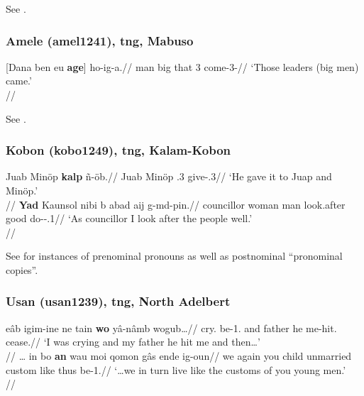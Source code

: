 See \citet[17f., 166, 181]{renck1975}.

\subsubsection{Amele (amel1241), \gls{tng}, Mabuso}

\ex \begingl
\gla {}[{Dana} {ben} {eu} \textbf{age}] ho-ig-a.//
\glb man big that 3\Pl{} come-3\Pl{}-\Todpst{}//
\glft `Those leaders (big men) came.'\\{\citep[after][210, (283)-(284)]{roberts1987amele}}//
\endgl
\xe

See \citet[162, 201, 209f.]{roberts1987amele}.

\subsubsection{Kobon (kobo1249), \gls{tng}, Kalam-Kobon}

\pex
\a
\begingl
\gla Juab Minöp \textbf{kal\textbari{}p} ñ-öb.//
\glb Juab Minöp \Obj.3\Du{}{} give-\Prf.3\Sg{}//
\glft `He gave it to Juap and Minöp.'\\{\citep[after][108, (264)]{davies1989}}//
\endgl
\a
\begingl
\gla \textbf{Yad} Kaunsol nibi b\textbari{} abad aij g\textbari{}-m\textbari{}d-pin.//
\Sg{} councillor woman man look.after good do-\Habit-\Pfv.1\Sg{}//
\glft `As councillor I look after the people well.' \\\citep[157, (408ad)]{davies1989}//
\endgl
\xe 

See  \citet[107f., 157]{davies1989} for instances of prenominal pronouns as well as postnominal ``pronominal copies''.

\subsubsection{Usan (usan1239), \gls{tng}, North Adelbert} 

\pex
\a \begingl
\gla eâb igim-ine ne tain \textbf{wo} yâ-nâmb wogub\ldots//
\glb cry.\Ss{} be-1\Sg.\Ds{} and father he me-hit.\Ss{} cease.\Ss{}//
\glft `I was crying and my father he hit me and then\ldots' \\
\citep[after][167, (99)]{reesink1987}//
\endgl
\a 
\begingl
\gla \ldots{} in bo \textbf{an} wau moi qomon gâs ende ig-oun//
\glb {} we again you child unmarried custom like thus be-1\Pl.\Prs{}//
\glft `\ldots we in turn live like the customs of you young men.'\\
\citep[part of][190f., (41)]{reesink1987}//
\endgl
\xe 

